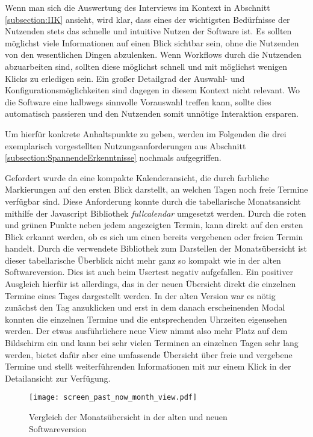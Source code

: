 Wenn man sich die Auswertung des Interviews im Kontext in Abschnitt
\ref{subsection:IIK} ansieht, wird klar, dass eines der wichtigsten Bedürfnisse
der Nutzenden stets das schnelle und intuitive Nutzen der Software ist. Es
sollten möglichst viele Informationen auf einen Blick sichtbar sein, ohne die
Nutzenden von den wesentlichen Dingen abzulenken. Wenn Workflows durch die
Nutzenden abzuarbeiten sind, sollten diese möglichst schnell und mit möglichst
wenigen Klicks zu erledigen sein. Ein großer Detailgrad der Auswahl- und
Konfigurationsmöglichkeiten sind dagegen in diesem Kontext nicht relevant. Wo
die Software eine halbwegs sinnvolle Vorauswahl treffen kann, sollte dies
automatisch passieren und den Nutzenden somit unnötige Interaktion ersparen.

Um hierfür konkrete Anhaltspunkte zu geben, werden im Folgenden die drei
exemplarisch vorgestellten Nutzungsanforderungen aus Abschnitt
\ref{subsection:SpannendeErkenntnisse} nochmals aufgegriffen.

Gefordert wurde da eine kompakte Kalenderansicht, die durch farbliche
Markierungen auf den ersten Blick darstellt, an welchen Tagen noch freie
Termine verfügbar sind. Diese Anforderung konnte durch die tabellarische
Monatsansicht mithilfe der Javascript Bibliothek \textit{fullcalendar}
umgesetzt werden. Durch die roten und grünen Punkte neben jedem angezeigten
Termin, kann direkt auf den ersten Blick erkannt werden, ob es sich um einen
bereits vergebenen oder freien Termin handelt. Durch die verwendete Bibliothek
zum Darstellen der Monatsübersicht ist dieser tabellarische Überblick nicht
mehr ganz so kompakt wie in der alten Softwareversion. Dies ist auch \ipName
beim Usertest negativ aufgefallen. Ein positiver Ausgleich hierfür ist
allerdings, das in der neuen Übersicht direkt die einzelnen Termine eines Tages
dargestellt werden. In der alten Version war es nötig zunächst den Tag
anzuklicken und erst in dem danach erscheinenden Modal konnten die einzelnen
Termine und die entsprechenden Uhrzeiten eigensehen werden. Der etwas
ausführlichere neue View nimmt also mehr Platz auf dem Bildschirm ein und kann
bei sehr vielen Terminen an einzelnen Tagen sehr lang werden, bietet dafür aber
eine umfassende Übersicht über freie und vergebene Termine und stellt
weiterführenden Informationen mit nur einem Klick in der Detailansicht zur
Verfügung.

\begin{figure}[H]
    \caption{Vergleich der Monatsübersicht in der alten und neuen Softwareversion}
    \centering
    \texttt{[image: screen\_past\_now\_month\_view.pdf]}
\end{figure}

